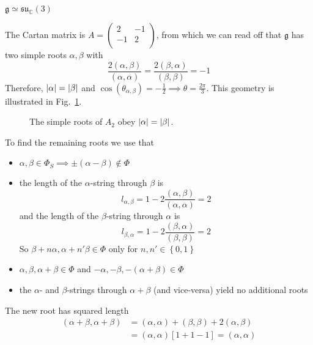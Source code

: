 \begin{example}[$\mathfrak{g} = A_2$]
   \quad $\mathfrak{g} \simeq \mathfrak{su}_{\mathbb{C}}(3)$ \par
  The Cartan matrix is $A = 
  \begin{pmatrix}
   2 & -1 \\
   -1 & 2 \\
  \end{pmatrix} $, from which we can read off that $\mathfrak{g}$  has two simple roots $\alpha, \beta$ with
   \begin{equation}
     \frac{2(\alpha, \beta)}{(\alpha, \alpha)} = \frac{2(\beta, \alpha)}{(\beta, \beta)} = -1
  \end{equation}
  Therefore, $\abs{\alpha} = \abs{\beta}$ and $\cos(\theta_{\alpha, \beta}) = -\frac{1}{2} \implies \theta = \frac{2\pi}{3}$. This geometry is illustrated in Fig.~\ref{fig:l21f1}.

  \begin{figure}[tbhp]
    \centering
    \def\svgwidth{0.3\columnwidth}
    
    \caption{The simple roots of $A_2$ obey $\abs{\alpha} = \abs{\beta}$.}
    \label{fig:l21f1}
  \end{figure}

  To find the remaining roots we use that
  \begin{itemize}
    \item $\alpha, \beta \in \Phi_S \implies \pm (\alpha - \beta) \not \in \Phi$ 
    \item the length of the $\alpha$-string through $\beta$  is \begin{equation}
	l_{\alpha, \beta} = 1 - 2 \frac{(\alpha, \beta)}{(\alpha, \alpha)} = 2
    \end{equation}  
    and the length of the $\beta$-string through $\alpha$ is 
      \begin{equation}
	l_{\beta, \alpha} = 1 - 2 \frac{(\beta, \alpha)}{(\beta, \beta)} = 2
    \end{equation}  
    So $\beta + n \alpha, \alpha + n' \beta \in \Phi$ only for $n, n' \in \left\{ 0, 1 \right\}$
    \item $\alpha, \beta, \alpha + \beta \in \Phi$ and $-\alpha, -\beta, -(\alpha + \beta) \in \Phi$
    \item the $\alpha$- and $\beta$-strings through $\alpha + \beta$ (and vice-versa) yield no additional roots
  \end{itemize}
  The new root has squared length
  \begin{align}
    (\alpha + \beta, \alpha + \beta) &= (\alpha, \alpha) + (\beta, \beta) + 2 (\alpha, \beta) \\
				     &= (\alpha, \alpha) [1 + 1 - 1] = (\alpha, \alpha)
  \end{align}


\end{example}
